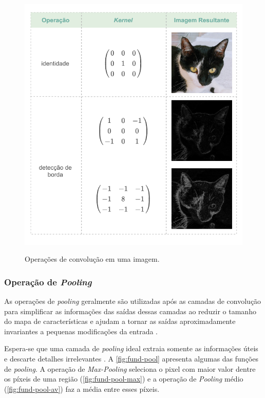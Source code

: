 \begin{figure}[h!] %
  \centering
  \caption{Operações de convolução em uma imagem.}
  \includegraphics[scale=1.1]{img/img-fundamentacao-fifits.pdf}
  \label{fig:fund-fifits}
\end{figure}

\subsubsection{Operação de \textit{Pooling}} \label{cap:fund-ia-rn-conv-pool}
As operações de \textit{pooling} geralmente são utilizadas após as camadas de convolução para simplificar as informações das saídas dessas camadas \cite{ref:Nielsen} ao reduzir o tamanho do mapa de características \cite{ref:Gholamalinezhad-Khosravi} e ajudam a tornar as saídas aproximadamente invariantes a pequenas modificações da entrada \cite{ref:Goodfellow-Bengio-Courville}.

Espera-se que uma camada de \textit{pooling} ideal extraia somente as informações úteis e descarte detalhes irrelevantes \cite{ref:Gholamalinezhad-Khosravi}. A \autoref{fig:fund-pool} apresenta algumas das funções de \textit{pooling}. A operação de \textit{Max-Pooling} seleciona o pixel com maior valor dentre os píxeis de uma região (\autoref{fig:fund-pool-max}) e a operação de \textit{Pooling} médio (\autoref{fig:fund-pool-av}) faz a média entre esses píxeis.

